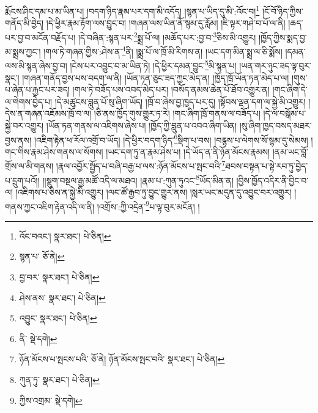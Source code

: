 རྨོངས་ཤིང་དམ་པ་མ་ཡིན་པ། །བདག་ཉིད་རྣམ་པར་དག་མི་འདོད། །སྙན་པ་ཡིད་དུ་མི་:འོང་བ།\footnote{འོང་བའང་།  སྣར་ཐང་།  པེ་ཅིན། } །ངོ་བོ་ཉིད་ཀྱིས་གནོད་མི་བྱེད། །དེ་ཕྱིར་རྣམ་རྟོག་ལས་བྱུང་བ། །གཞན་ལས་ཡིན་ནོ་སྙམ་དུ་རློམ། །ཇི་ལྟར་གཤེ་བ་པོ་ལ་ནི། །ཆད་པར་བྱ་བ་མངོན་བརྗོད་པ། །དེ་བཞིན་:སྙན་པར་\footnote{སྙན་པ་  ཅོ་ནེ། }སྨྲ་པོ་ལ། །མཆོད་པར་:བྱ་བ་\footnote{བྱ་བར་  སྣར་ཐང་།  པེ་ཅིན། }ཅིས་མི་འགྱུར། །ཁྱོད་ཀྱིས་སྨད་བྱ་མ་སྨྲས་ཀྱང་། །གལ་ཏེ་གཞན་གྱིས་:ཤེས་ན་\footnote{ཤེས་ནས་  སྣར་ཐང་།  པེ་ཅིན། }ནི། །སྨྲ་པོ་ལ་ཁྲོ་མི་རིགས་ན། །ཡང་དག་མིན་སྨྲ་ལ་ཅི་སྨོས། །དམན་ལས་མི་སྙན་ཞེས་བྱ་བ། །ངེས་པར་འབྱུང་བ་མ་ཡིན་ཏེ། །དེ་ཕྱིར་དམན་བྱུང་\footnote{འབྱུང་  སྣར་ཐང་།  པེ་ཅིན། }མི་སྙན་པ། །ཡན་གར་ཉུང་ཟད་ལྟ་བུར་སྣང་། །གཞན་གནོད་བྱས་པས་བདག་ལ་ནི། །ཡོན་ཏན་ཅུང་ཟད་ཀྱང་མེད་ན། །ཁྱོད་ཁྲོ་ཡོན་ཏན་མེད་པ་ལ། །གུས་པ་ཞེན་པ་རྐྱང་པར་ཟད། །གལ་ཏེ་བཟོད་པས་འབད་མེད་པར། །བསོད་ནམས་ཆེན་པོ་ཐོབ་འགྱུར་ན། །གང་ཞིག་དེ་ལ་གེགས་བྱེད་པ། །དེ་མཚུངས་བླུན་པོ་སུ་ཞིག་ཡོད། །ཁྲོ་བ་ཞེས་བྱ་ཁྱད་པར་དུ། །སྟོབས་ལྡན་དག་ལ་སྐྱེ་མི་འགྱུར། །དེས་ན་གཞན་འཇོམས་ཁྲོ་བ་ལ། །ཅི་ནས་ཁྱོད་གུས་གྱུར་ཏ་རེ། །གང་ཞིག་ཁྲོ་གནས་ལ་བཟོད་པ། །དེ་ལ་བསྒོམ་པ་སྐྱེ་བར་འགྱུར། །ཡོན་ཏན་གནས་ལ་འཇིགས་ཞེས་པ། །ཁྱོད་ཀྱི་བླུན་པ་འབའ་ཞིག་ཡིན། །སུ་ཞིག་ཁྱད་བསད་མཐར་བྱས་ནས། །འཇིག་རྟེན་ཕ་རོལ་འགྲོ་བ་ཡོད། །དེ་ཕྱིར་བདག་ཉིད་\footnote{ནི་  སྡེ་དགེ། }སྡིག་པ་བས། །བརྙས་པ་ལེགས་སོ་སྙམ་དུ་སེམས། །གང་གིས་རྣམ་ཤེས་གནས་ལ་སོགས། །ཡང་དག་ཏུ་ན་རྣམ་ཤེས་པ། །དེ་ཡོད་ན་ནི་ཉོན་མོངས་རྣམས། །ནམ་ཡང་བློ་གྲོས་ལ་མི་གནས། །རྣལ་འབྱོར་སྤྱོད་པ་བཞི་བརྒྱ་པ་ལས་:ཉོན་མོངས་པ་སྤང་བའི་\footnote{ཉོན་མོངས་པ་སྤངས་པའི་  ཅོ་ནེ། ཉོན་མོངས་སྤང་བའི་  སྣར་ཐང་།  པེ་ཅིན། }ཐབས་བསྟན་པ་སྟེ་རབ་ཏུ་བྱེད་པ་དྲུག་པའོ།། །།སྡུག་བསྔལ་རྒྱ་མཚོ་འདི་ལ་མཐའ། །རྣམ་པ་:ཀུན་ཏུའང་\footnote{ཀུན་ཏུ་  སྣར་ཐང་།  པེ་ཅིན། }ཡོད་མིན་ན། །བྱིས་ཁྱོད་འདིར་ནི་བྱིང་བ་ལ། །འཇིགས་པ་ཅིས་ན་སྐྱེ་མི་འགྱུར། །ལང་ཚོ་རྒྱབ་ཏུ་བྱུང་གྱུར་ནས། །སླར་ཡང་མདུན་དུ་འབྱུང་བར་འགྱུར། །གནས་ཀྱང་འཇིག་རྟེན་འདི་ལ་ནི། །འགྲོས་:ཀྱི་འདྲེན་\footnote{ཀྱིས་འགྲམ་  སྡེ་དགེ། }པ་ལྟ་བུར་མངོན། །
